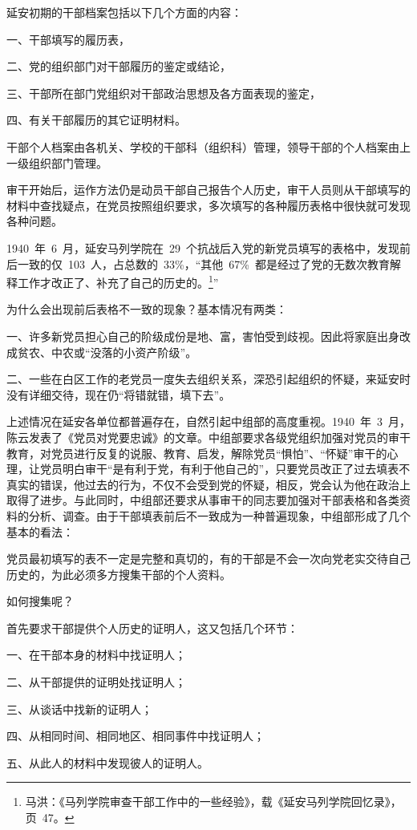 延安初期的干部档案包括以下几个方面的内容：

一、干部填写的履历表，

二、党的组织部门对干部履历的鉴定或结论，

三、干部所在部门党组织对干部政治思想及各方面表现的鉴定，

四、有关干部履历的其它证明材料。

干部个人档案由各机关、学校的干部科（组织科）管理，领导干部的个人档案由上一级组织部门管理。

审干开始后，运作方法仍是动员干部自己报告个人历史，审干人员则从干部填写的材料中查找疑点，在党员按照组织要求，多次填写的各种履历表格中很快就可发现各种问题。

1940~年~6~月，延安马列学院在~29~个抗战后入党的新党员填写的表格中，发现前后一致的仅~103~人，占总数的~33\%，“其他~67\%~都是经过了党的无数次教育解释工作才改正了、补充了自己的历史的。\footnote{马洪：《马列学院审查干部工作中的一些经验》，载《延安马列学院回忆录》，页~47。}”

为什么会出现前后表格不一致的现象？基本情况有两类：

一、许多新党员担心自己的阶级成份是地、富，害怕受到歧视。因此将家庭出身改成贫农、中农或“没落的小资产阶级”。

二、一些在白区工作的老党员一度失去组织关系，深恐引起组织的怀疑，来延安时没有详细交待，现在仍“将错就错，填下去”。

上述情况在延安各单位都普遍存在，自然引起中组部的高度重视。1940~年~3~月，陈云发表了《党员对党要忠诚》的文章。中组部要求各级党组织加强对党员的审干教育，对党员进行反复的说服、教育、启发，解除党员“惧怕”、“怀疑”审干的心理，让党员明白审干“是有利于党，有利于他自己的”，只要党员改正了过去填表不真实的错误，他过去的行为，不仅不会受到党的怀疑，相反，党会认为他在政治上取得了进步。与此同时，中组部还要求从事审干的同志要加强对干部表格和各类资料的分析、调查。由于干部填表前后不一致成为一种普遍现象，中组部形成了几个基本的看法：

党员最初填写的表不一定是完整和真切的，有的干部是不会一次向党老实交待自己历史的，为此必须多方搜集干部的个人资料。

如何搜集呢？

首先要求干部提供个人历史的证明人，这又包括几个环节：

一、在干部本身的材料中找证明人；

二、从干部提供的证明处找证明人；

三、从谈话中找新的证明人；

四、从相同时间、相同地区、相同事件中找证明人；

五、从此人的材料中发现彼人的证明人。


